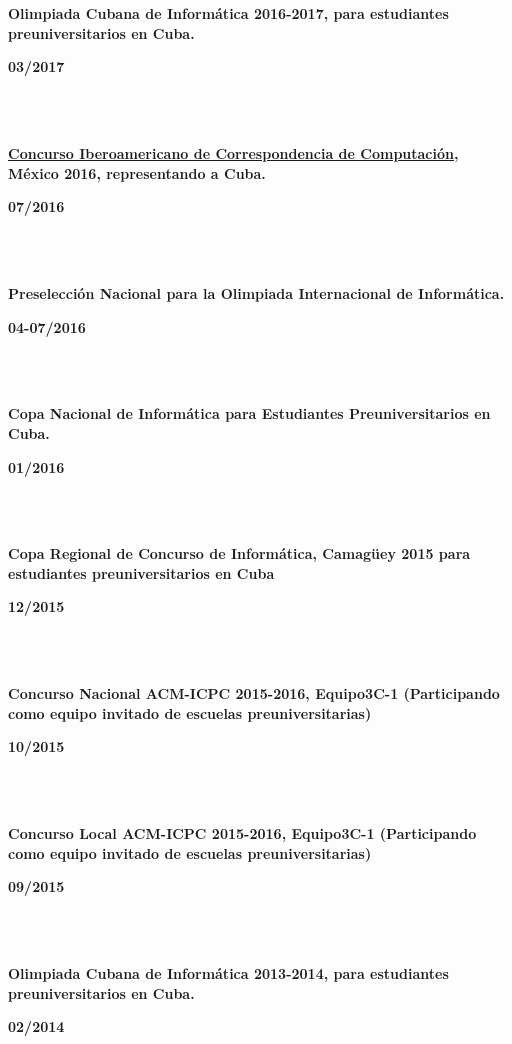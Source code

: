 \documentclass{article}
\begin{document}
\begin{minipage}{0.8\textwidth}
\parbox{0.8\linewidth}{\textbf{Olimpiada Cubana de Informática 2016-2017, para estudiantes preuniversitarios en Cuba.}} \hfill \textbf{03/2017}\\
\\
\end{minipage}\\
\begin{minipage}{0.8\textwidth}
\parbox{0.8\linewidth}{\textbf{\hyperref[sec:ibero]{Concurso Iberoamericano de Correspondencia de Computación}, México 2016, representando a Cuba.}} \hfill \textbf{07/2016}\\
\\
\end{minipage}\\
\begin{minipage}{0.8\textwidth}
\parbox{0.8\linewidth}{\textbf{Preselección Nacional para la Olimpiada Internacional de Informática.}} \hfill \textbf{04-07/2016}\\
\\
\end{minipage}\\
\begin{minipage}{0.8\textwidth}
\parbox{0.8\linewidth}{\textbf{Copa Nacional de Informática para Estudiantes Preuniversitarios en Cuba.}} \hfill \textbf{01/2016}\\
\\
\end{minipage}\\
\begin{minipage}{0.8\textwidth}
\parbox{0.8\linewidth}{\textbf{Copa Regional de Concurso de Informática, Camagüey 2015 para estudiantes preuniversitarios en Cuba}} \hfill \textbf{12/2015}\\
\\
\end{minipage}\\
\begin{minipage}{0.8\textwidth}
\parbox{0.8\linewidth}{\textbf{Concurso Nacional ACM-ICPC 2015-2016, Equipo3C-1 (Participando como equipo invitado de escuelas preuniversitarias)}} \hfill \textbf{10/2015}\\
\\
\end{minipage}\\
\begin{minipage}{0.8\textwidth}
\parbox{0.8\linewidth}{\textbf{Concurso Local ACM-ICPC 2015-2016, Equipo3C-1 (Participando como equipo invitado de escuelas preuniversitarias)}} \hfill \textbf{09/2015}\\
\\
\end{minipage}\\
\begin{minipage}{0.8\textwidth}
\parbox{0.8\linewidth}{\textbf{Olimpiada Cubana de Informática 2013-2014, para estudiantes preuniversitarios en Cuba.}} \hfill \textbf{02/2014}\\
\\
\end{minipage}\\
\end{document}

